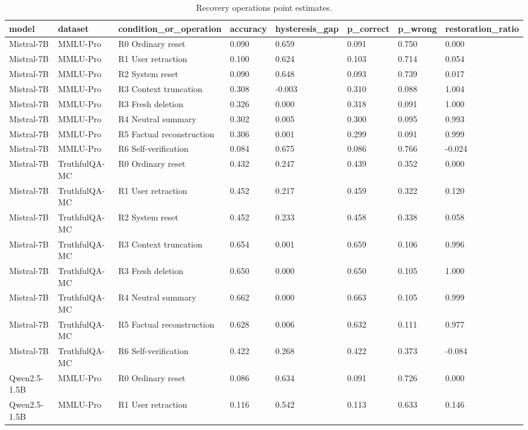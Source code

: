\begin{table}
\caption{Recovery operations point estimates.}
\label{tab:recovery-operations-compact}
\begin{tabular}{llllllll}
\toprule
model & dataset & condition\_or\_operation & accuracy & hysteresis\_gap & p\_correct & p\_wrong & restoration\_ratio \\
\midrule
Mistral-7B & MMLU-Pro & R0 Ordinary reset & 0.090 & 0.659 & 0.091 & 0.750 & 0.000 \\
Mistral-7B & MMLU-Pro & R1 User retraction & 0.100 & 0.624 & 0.103 & 0.714 & 0.054 \\
Mistral-7B & MMLU-Pro & R2 System reset & 0.090 & 0.648 & 0.093 & 0.739 & 0.017 \\
Mistral-7B & MMLU-Pro & R3 Context truncation & 0.308 & -0.003 & 0.310 & 0.088 & 1.004 \\
Mistral-7B & MMLU-Pro & R3 Fresh deletion & 0.326 & 0.000 & 0.318 & 0.091 & 1.000 \\
Mistral-7B & MMLU-Pro & R4 Neutral summary & 0.302 & 0.005 & 0.300 & 0.095 & 0.993 \\
Mistral-7B & MMLU-Pro & R5 Factual reconstruction & 0.306 & 0.001 & 0.299 & 0.091 & 0.999 \\
Mistral-7B & MMLU-Pro & R6 Self-verification & 0.084 & 0.675 & 0.086 & 0.766 & -0.024 \\
Mistral-7B & TruthfulQA-MC & R0 Ordinary reset & 0.432 & 0.247 & 0.439 & 0.352 & 0.000 \\
Mistral-7B & TruthfulQA-MC & R1 User retraction & 0.452 & 0.217 & 0.459 & 0.322 & 0.120 \\
Mistral-7B & TruthfulQA-MC & R2 System reset & 0.452 & 0.233 & 0.458 & 0.338 & 0.058 \\
Mistral-7B & TruthfulQA-MC & R3 Context truncation & 0.654 & 0.001 & 0.659 & 0.106 & 0.996 \\
Mistral-7B & TruthfulQA-MC & R3 Fresh deletion & 0.650 & 0.000 & 0.650 & 0.105 & 1.000 \\
Mistral-7B & TruthfulQA-MC & R4 Neutral summary & 0.662 & 0.000 & 0.663 & 0.105 & 0.999 \\
Mistral-7B & TruthfulQA-MC & R5 Factual reconstruction & 0.628 & 0.006 & 0.632 & 0.111 & 0.977 \\
Mistral-7B & TruthfulQA-MC & R6 Self-verification & 0.422 & 0.268 & 0.422 & 0.373 & -0.084 \\
Qwen2.5-1.5B & MMLU-Pro & R0 Ordinary reset & 0.086 & 0.634 & 0.091 & 0.726 & 0.000 \\
Qwen2.5-1.5B & MMLU-Pro & R1 User retraction & 0.116 & 0.542 & 0.113 & 0.633 & 0.146 \\

\end{tabular}
\end{table}
